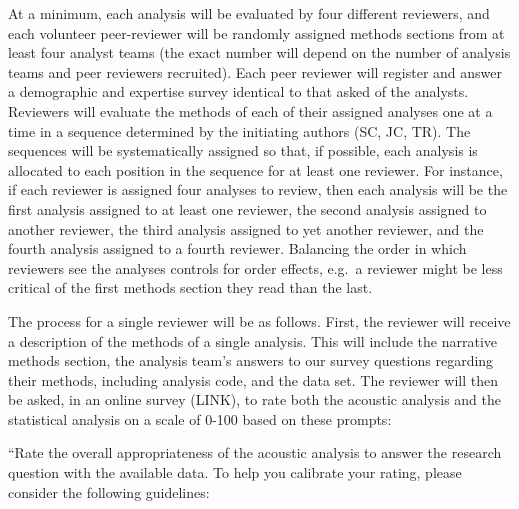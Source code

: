 \documentclass[
  english,
  man]{apa6}
\begin{document}
At a minimum, each analysis will be evaluated by four different reviewers, and each volunteer peer-reviewer will be randomly assigned methods sections from at least four analyst teams (the exact number will depend on the number of analysis teams and peer reviewers recruited).
Each peer reviewer will register and answer a demographic and expertise survey identical to that asked of the analysts.
Reviewers will evaluate the methods of each of their assigned analyses one at a time in a sequence determined by the initiating authors (SC, JC, TR).
The sequences will be systematically assigned so that, if possible, each analysis is allocated to each position in the sequence for at least one reviewer.
For instance, if each reviewer is assigned four analyses to review, then each analysis will be the first analysis assigned to at least one reviewer, the second analysis assigned to another reviewer, the third analysis assigned to yet another reviewer, and the fourth analysis assigned to a fourth reviewer.
Balancing the order in which reviewers see the analyses controls for order effects, e.g.~a reviewer might be less critical of the first methods section they read than the last.

The process for a single reviewer will be as follows.
First, the reviewer will receive a description of the methods of a single analysis.
This will include the narrative methods section, the analysis team's answers to our survey questions regarding their methods, including analysis code, and the data set.
The reviewer will then be asked, in an online survey (LINK), to rate both the acoustic analysis and the statistical analysis on a scale of 0-100 based on these prompts:

``Rate the overall appropriateness of the acoustic analysis to answer the research question with the available data. To help you calibrate your rating, please consider the following guidelines:
\end{document}
